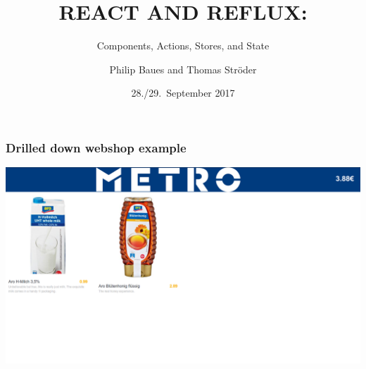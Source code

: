 \documentclass{beamer}
\begin{document}
\title[React and Reflux]{REACT AND REFLUX:}
\subtitle{Components, Actions, Stores, and State}
\author[P.\ Baues, T.\ Str\"oder]{Philip Baues and Thomas Str\"oder}
\date{28./29.\ September 2017}
\newcommand{\location}{\texttt{code.talks} Hamburg}

\metroslide

{
\begin{frame}[plain]
\titlepage
\end{frame}
}

\begin{frame}\frametitle{Drilled down webshop example}
\centering
\includegraphics[width=.99\linewidth,height=.85\textheight,keepaspectratio]{pics/ExampleWebshop.png}
\end{frame}
\end{document}
